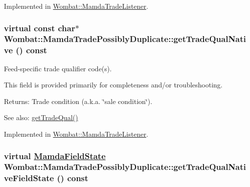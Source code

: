 Implemented in \hyperlink{classWombat_1_1MamdaTradeListener_958ea55776c3afa0a572b8819d9c04c8}{Wombat::Mamda\-Trade\-Listener}.\hypertarget{classWombat_1_1MamdaTradePossiblyDuplicate_ea042cedf017d3e9b495a68e20879de7}{
\subsubsection[getTradeQualNative]{\setlength{\rightskip}{0pt plus 5cm}virtual const char$\ast$ Wombat::Mamda\-Trade\-Possibly\-Duplicate::get\-Trade\-Qual\-Native () const}}
\label{classWombat_1_1MamdaTradePossiblyDuplicate_ea042cedf017d3e9b495a68e20879de7}


Feed-specific trade qualifier code(s). 

This field is provided primarily for completeness and/or troubleshooting.

\begin{Desc}
\item[Returns:]Trade condition (a.k.a. \char`\"{}sale condition\char`\"{}). \end{Desc}
\begin{Desc}
\item[See also:]\hyperlink{classWombat_1_1MamdaTradePossiblyDuplicate_62f7b023cc1c27db3e18ace440695d68}{get\-Trade\-Qual()} \end{Desc}


Implemented in \hyperlink{classWombat_1_1MamdaTradeListener_7b01373c290fe46a0a1e00a861996a06}{Wombat::Mamda\-Trade\-Listener}.\hypertarget{classWombat_1_1MamdaTradePossiblyDuplicate_c74fec65a80f2b42976ebb509a9abfeb}{
\subsubsection[getTradeQualNativeFieldState]{\setlength{\rightskip}{0pt plus 5cm}virtual \hyperlink{namespaceWombat_93aac974f2ab713554fd12a1fa3b7d2a}{Mamda\-Field\-State} Wombat::Mamda\-Trade\-Possibly\-Duplicate::get\-Trade\-Qual\-Native\-Field\-State () const}}
\label{classWombat_1_1MamdaTradePossiblyDuplicate_c74fec65a80f2b42976ebb509a9abfeb}


